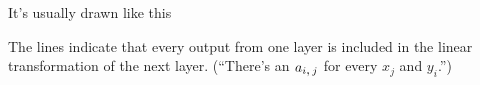\documentclass[aspectratio=169]{beamer}
\begin{document}
\begin{frame}{It's usually drawn like this}
\vspace{0.25 cm}

\vspace{0.25 cm}
The lines indicate that every output from one layer is included in the linear transformation of the next layer. (``There's an $a_{i\mbox{,\,}j}$ for every $x_j$ and $y_i$.'')
\end{frame}
\end{document}
